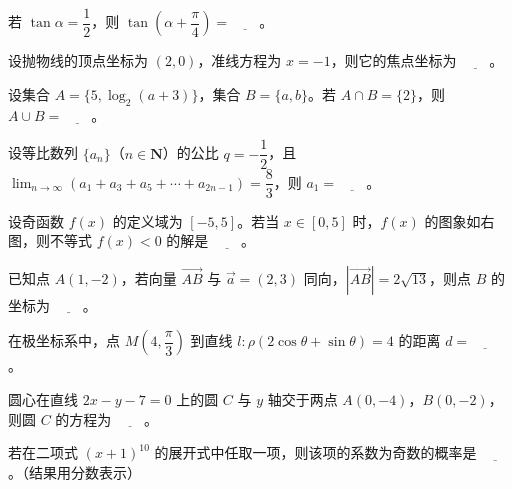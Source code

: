\begin{question}
若 $\tan\alpha = \dfrac{1}{2}$，则 $\tan\left(\alpha + \dfrac{\pi}{4}\right) = \underline{\qquad}$。

\end{question}
\begin{question}
设抛物线的顶点坐标为 $(2, 0)$，准线方程为 $x = -1$，则它的焦点坐标为 $\underline{\qquad}$。

\end{question}
\begin{question}
设集合 $A = \{5, \log_2(a + 3)\}$，集合 $B = \{a, b\}$。若 $A \cap B = \{2\}$，则 $A \cup B = \underline{\qquad}$。

\end{question}
\begin{question}
设等比数列 $\{a_n\}$（$n \in \mathbf{N}$）的公比 $q = -\dfrac{1}{2}$，且 $\displaystyle\lim_{n\to\infty}(a_1 + a_3 + a_5 + \cdots + a_{2n-1}) = \dfrac{8}{3}$，则 $a_1 = \underline{\qquad}$。

\Needspace{0.4\textheight}
\end{question}
\begin{question}
设奇函数 $f(x)$ 的定义域为 $[-5, 5]$。若当 $x \in [0, 5]$ 时，$f(x)$ 的图象如右图，则不等式 $f(x) < 0$ 的解是 $\underline{\qquad}$。
\nopagebreak[4]
\begin{center}\end{center}
\nopagebreak[4]
\end{question}
\begin{question}
已知点 $A(1, -2)$，若向量 $\overrightarrow{AB}$ 与 $\vec{a} = (2, 3)$ 同向，$|\overrightarrow{AB}| = 2\sqrt{13}$，则点 $B$ 的坐标为 $\underline{\qquad}$。

\end{question}
\begin{question}
在极坐标系中，点 $M\left(4, \dfrac{\pi}{3}\right)$ 到直线 $l: \rho(2\cos\theta + \sin\theta) = 4$ 的距离 $d = \underline{\qquad}$。

\end{question}
\begin{question}
圆心在直线 $2x - y - 7 = 0$ 上的圆 $C$ 与 $y$ 轴交于两点 $A(0, -4)$，$B(0, -2)$，则圆 $C$ 的方程为 $\underline{\qquad}$。

\end{question}
\begin{question}
若在二项式 $(x + 1)^{10}$ 的展开式中任取一项，则该项的系数为奇数的概率是 $\underline{\qquad}$。（结果用分数表示）

\end{question}
